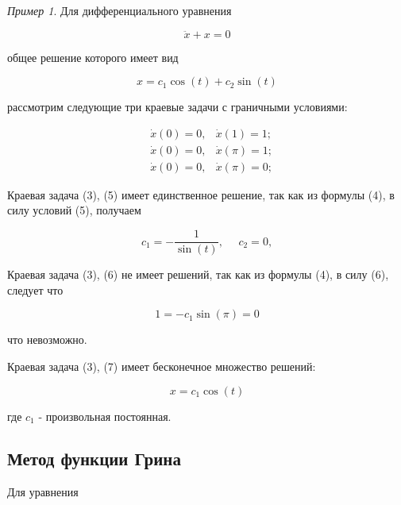 \documentclass{article}
\theoremstyle{plain} \newtheorem*{theorem*}{Теорема}
\theoremstyle{plain} \newtheorem{theorem}{Теорема}[section]
\theoremstyle{defintition} \newtheorem*{corollary*}{Следствие}
\theoremstyle{remark} \newtheorem*{example*}{Пример}
\theoremstyle{remark} \newtheorem*{remark*}{Замечание}
\begin{document}
\begin{example*}
    Для дифференциального уравнения

    \begin{equation}
        \ddot{x} + x = 0
    \end{equation}

    общее решение которого имеет вид

    \begin{equation}
        x = c_1 \cos(t) + c_2 \sin(t)
    \end{equation}

    рассмотрим следующие три краевые задачи
    с граничными условиями:

    \begin{align}
        &\dot{x}(0) = 0, &\dot{x}(1) = 1; \\
        &\dot{x}(0) = 0, &\dot{x}(\pi) = 1; \\
        &\dot{x}(0) = 0, &\dot{x}(\pi) = 0;
    \end{align}

    Краевая задача (3), (5) имеет единственное решение,
    так как из формулы (4), в силу условий (5), получаем

    \begin{equation*}
        c_1 = - \frac{1}{\sin(t)}, \ \ \ \ \ \
        c_2 = 0,
    \end{equation*}

    Краевая задача (3), (6) не имеет решений,
    так как из формулы (4), в силу (6), следует что

    \begin{equation*}
        1 = -c_1 \sin(\pi) = 0
    \end{equation*}

    что невозможно.

    Краевая задача (3), (7) имеет бесконечное множество решений:

    \begin{equation*}
        x = c_1 \cos(t)
    \end{equation*}

    где $c_1$ - произвольная постоянная.

\end{example*}

\subsection*{Метод функции Грина}

Для уравнения
\end{document}

